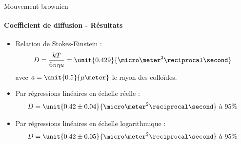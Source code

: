 \documentclass[11pt]{beamer}
\begin{document}
\begin{frame}{Mouvement brownien}
\framesubtitle{Coefficient de diffusion - Résultats}
\begin{itemize}
\item Relation de Stokes-Einstein : 
\begin{equation*}
D = \frac{kT}{6\pi \eta a} = \unit{0.429}{\micro\meter^2 \reciprocal \second}
\end{equation*}
avec $a = \unit{0.5}{\mu\meter}$ le rayon des colloïdes. 
\item Par régressions linéaires en échelle réelle : 
\begin{equation*}
D = \unit{0.42 \pm 0.04}{\micro\meter^2 \reciprocal \second} \text{ à 95\%}
\end{equation*}
\item Par régressions linéaires en échelle logarithmique : 
\begin{equation*}
D = \unit{0.42 \pm 0.05}{\micro\meter^2 \reciprocal \second} \text{ à 95\%}
\end{equation*} 
\end{itemize}
\end{frame}
\end{document}
